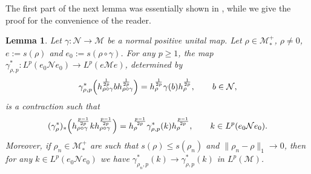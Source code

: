 \documentclass[12pt]{article}
\newtheorem{lemma}[theorem]{Lemma}
\theoremstyle{definition}
\theoremstyle{remark}
\numberwithin{equation}{section}
\def\Me{\mathcal M}
\def\Ne{\mathcal N}
\begin{document}
{The first part of the next lemma was essentially shown in
\cite[Proposition 3.12]{jencova2018renyi}, while we give the proof for the convenience of the reader.}

\begin{lemma}\label{lemma:pcontraction} Let $\gamma:\Ne\to \Me$ be a normal positive unital map.
Let $\rho\in \Me_*^+$, {$\rho\ne0$,} $e:=s(\rho)$ and $e_0:=s(\rho\circ\gamma)$. For any
$p\ge 1$, the map $\gamma^*_{\rho,p}:L^p(e_0 \Ne e_0)\to L^p(e\Me e)$, determined by
\begin{align}\label{gamma-rho-p1}
\gamma^*_{\rho,p}\Bigl(h_{\rho\circ\gamma}^{1\over 2p}bh^{1\over2p}_{\rho\circ\gamma}\Bigr)
=h_\rho^{1\over 2p}\gamma(b) h_\rho^{1\over 2p},\qquad b\in \Ne,
\end{align}
is a contraction such that 
\begin{align}\label{gamma-rho-p2}
(\gamma^*_\rho)_*\Bigl(h_{\rho\circ\gamma}^{p-1\over 2p}k
h_{\rho\circ\gamma}^{p-1\over2p}\Bigr)
=h_\rho^{p-1\over 2p}\gamma^*_{\rho,p}(k)h_\rho^{p-1\over 2p},\qquad
k\in L^p(e_0 \Ne e_0).
\end{align}
Moreover, if $\rho_n\in \Me_*^+$ are such that $s(\rho)\le s(\rho_n)$ and
$\|\rho_n-\rho\|_1\to 0$, then for any $k\in L^p(e_0 \Ne e_0)$ we have
$\gamma^*_{\rho_n,p}(k)\to \gamma^*_{\rho,p}(k)$ in $L^p(\Me)$.

\end{lemma}
\end{document}
